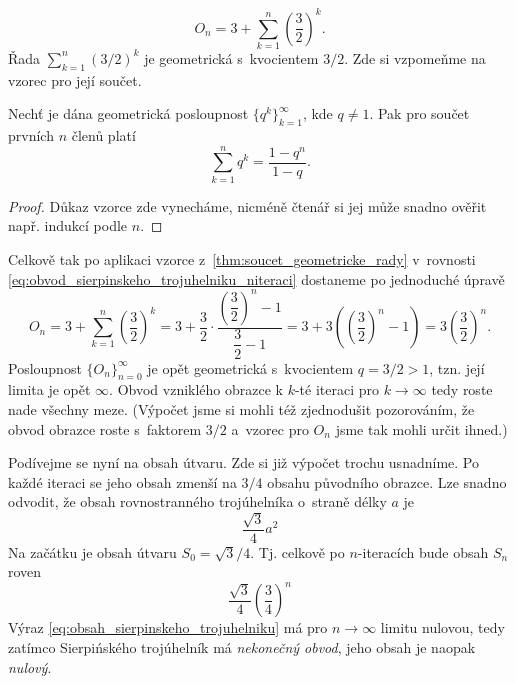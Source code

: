 \begin{equation}\label{eq:obvod_sierpinskeho_trojuhelniku_niteraci}
    O_n=3+\sum_{k=1}^n{\left(\dfrac{3}{2}\right)^k}.
\end{equation}
Řada $\sum_{k=1}^{n}(3/2)^k$ je geometrická s~kvocientem $3/2$. Zde si vzpomeňme na vzorec pro její součet.
\begin{theorem}\label{thm:soucet_geometricke_rady}
    Nechť je dána geometrická posloupnost $\{q^k\}_{k=1}^\infty$, kde $q\neq 1$. Pak pro součet prvních $n$ členů platí
    \begin{equation*}
        \sum_{k=1}^{n}{q^k}=\dfrac{1-q^n}{1-q}.
    \end{equation*}
\end{theorem}
\begin{proof}
    Důkaz vzorce zde vynecháme, nicméně čtenář si jej může snadno ověřit např. indukcí podle $n$. 
\end{proof}
Celkově tak po aplikaci vzorce z~\ref{thm:soucet_geometricke_rady} v~rovnosti \eqref{eq:obvod_sierpinskeho_trojuhelniku_niteraci} dostaneme po jednoduché úpravě
\begin{equation*}
    O_n=3+\sum_{k=1}^n{\left(\dfrac{3}{2}\right)^k}=3+\dfrac{3}{2}\cdot\dfrac{\left(\dfrac{3}{2}\right)^n-1}{\dfrac{3}{2}-1}=3+3\left(\left(\dfrac{3}{2}\right)^n-1\right)=3\left(\dfrac{3}{2}\right)^n.
\end{equation*}
Posloupnost $\{O_n\}_{n=0}^\infty$ je opět geometrická s~kvocientem $q=3/2>1$, tzn. její limita je opět $\infty$. Obvod vzniklého obrazce k $k$-té iteraci pro $k\to\infty$ tedy roste nade všechny meze. (Výpočet jsme si mohli též zjednodušit pozorováním, že obvod obrazce roste s~faktorem $3/2$ a~vzorec pro $O_n$ jsme tak mohli určit ihned.)\par
Podívejme se nyní na obsah útvaru. Zde si již výpočet trochu usnadníme. Po každé iteraci se jeho obsah zmenší na $3/4$ obsahu původního obrazce. Lze snadno odvodit, že obsah rovnostranného trojúhelníka o~straně délky $a$ je
\begin{equation*}
    \dfrac{\sqrt{3}}{4}a^2
\end{equation*}
Na začátku je obsah útvaru $S_0=\sqrt{3}/4$. Tj. celkově po $n$-iteracích bude obsah $S_n$ roven
\begin{equation}\label{eq:obsah_sierpinskeho_trojuhelniku}
    \dfrac{\sqrt{3}}{4}\left(\dfrac{3}{4}\right)^n
\end{equation}
Výraz \eqref{eq:obsah_sierpinskeho_trojuhelniku} má pro $n\to\infty$ limitu nulovou, tedy zatímco Sierpińského trojúhelník má \emph{nekonečný obvod}, jeho obsah je naopak \emph{nulový}.

